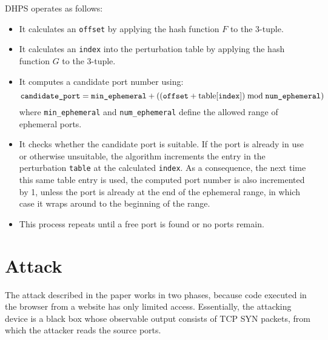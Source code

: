 \documentclass{report}
\begin{document}
DHPS operates as follows:
\begin{itemize}
    \item It calculates an \texttt{offset} by applying the hash function \( F \) to the 3-tuple.
    \item It calculates an \texttt{index} into the perturbation table by applying the hash function \( G \) to the 3-tuple.
    \item It computes a candidate port number using:
    \[
      \texttt{candidate\_port} = \texttt{min\_ephemeral} + ((\texttt{offset} + \text{table[\texttt{index}]}) \bmod \texttt{num\_ephemeral})
    \]
    where \texttt{min\_ephemeral} and \texttt{num\_ephemeral} define the allowed range of ephemeral ports.
  \item It checks whether the candidate port is suitable. If the port is already in use or otherwise unsuitable, the algorithm increments the entry in the perturbation \texttt{table} at the calculated \texttt{index}. As a consequence, the next time this same table entry is used, the computed port number is also incremented by 1, unless the port is already at the end of the ephemeral range, in which case it wraps around to the beginning of the range. 
  \item This process repeats until a free port is found or no ports remain.
\end{itemize}

\begin{center}
		\begin{minipage}[t]{0.5\textwidth}
			\vspace{0cm}

			
		\end{minipage}
\end{center}


\vspace{0.5cm}
\chapter{Attack}
\label{sec:attack}

The attack described in the paper works in two phases, because code executed in the browser from a website has only limited access. Essentially, the attacking device is a black box whose observable output consists of TCP SYN packets, from which the attacker reads the source ports.
\end{document}
